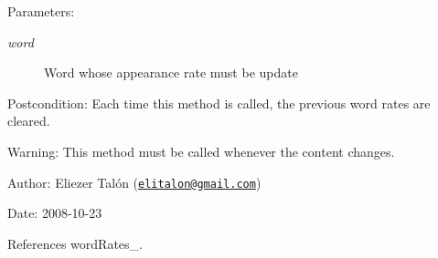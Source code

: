 \begin{Desc}
\item[Parameters:]
\begin{description}
\item[{\em word}]Word whose appearance rate must be update\end{description}
\end{Desc}
\begin{Desc}
\item[Postcondition:]Each time this method is called, the previous word rates are cleared.\end{Desc}
\begin{Desc}
\item[Warning:]This method must be called whenever the content changes.\end{Desc}
\begin{Desc}
\item[Author:]Eliezer Talón (\href{mailto:elitalon@gmail.com}{\tt elitalon@gmail.com}) \end{Desc}
\begin{Desc}
\item[Date:]2008-10-23 \end{Desc}


References wordRates\_\-.
